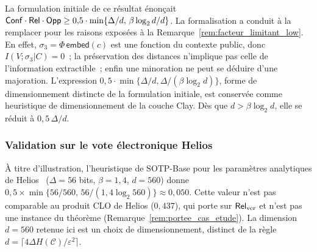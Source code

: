 \begin{sloppypar}
\begin{remark}
\label{rem:heuristique_sotp_base}
La formulation initiale de ce r\'esultat \'enon\c{c}ait
$\mathsf{Conf} \cdot \mathsf{Rel} \cdot \mathsf{Opp} \geq 0{,}5 \cdot \min\{\Delta/d,\, \beta\log_2 d/d\}$.
La formalisation a conduit \`a la remplacer pour les raisons expos\'ees \`a la
Remarque~\ref{rem:facteur_limitant_low}. En effet, $\sigma_3 = \Phi\,\mathsf{embed}(c)$ est
une fonction du contexte public, donc $I(V;\sigma_3|C) = 0$~; la pr\'eservation
des distances n'implique pas celle de l'information extractible~; enfin une
minoration ne peut se d\'eduire d'une majoration. L'expression
$0{,}5 \cdot \min\{\Delta/d, \Delta/(\beta\log_2 d)\}$, forme de dimensionnement distincte de la
formulation initiale, est conserv\'ee comme heuristique de dimensionnement de la couche Clay.
D\`es que $d > \beta\log_2 d$, elle se r\'eduit \`a $0{,}5\,\Delta/d$.
\end{remark}

\subsubsection{Validation sur le vote \'electronique Helios}
\label{subsubsec:validation_helios}

\`A titre d'illustration, l'heuristique de SOTP-Base pour les param\`etres
analytiques de Helios~\cite{Adida08,MINKA2026CRO} ($\Delta = 56$ bits, $\beta = 1{,}4$,
$d = 560$) donne $0{,}5 \times \min\{56/560,\, 56/(1{,}4 \log_2 560)\} \approx 0{,}050$.
Cette valeur n'est pas comparable au produit CLO de Helios ($0{,}437$), qui porte
sur $\mathsf{Rel}_{\mathrm{ver}}$ et n'est pas une instance du th\'eor\`eme
(Remarque~\ref{rem:portee_cas_etude}). La dimension $d = 560$ retenue ici est un
choix de dimensionnement, distinct de la r\`egle $d = \lceil 4\Delta H(\mathcal{C})/\varepsilon^2\rceil$.
\end{sloppypar}

